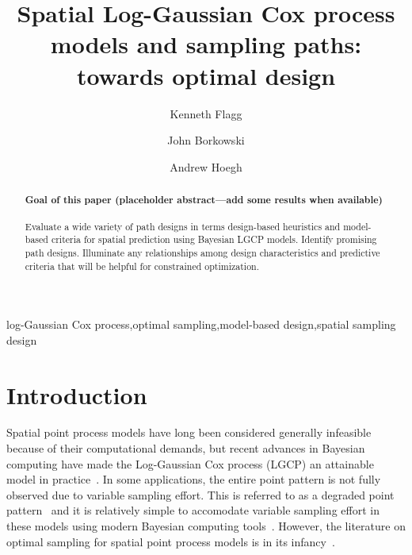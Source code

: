 \documentclass[review]{elsarticle}
\begin{document}
\begin{frontmatter}

\title{Spatial Log-Gaussian Cox process models and sampling paths: towards optimal design}

\author[msuaddr]{Kenneth Flagg}

\author[msuaddr]{John Borkowski}
\author[msuaddr]{Andrew Hoegh}

\address[msuaddr]{Department of Mathematical Sciences, Montana State University, Bozeman, MT 59717}

\begin{abstract}

\paragraph{Goal of this paper (placeholder abstract---add some results when
available)} Evaluate a wide variety of path designs in terms design-based
heuristics and model-based criteria for spatial prediction using Bayesian LGCP
models. Identify promising path designs. Illuminate any relationships among
design characteristics and predictive criteria that will be helpful for
constrained optimization.

\end{abstract}

\begin{keyword}
log-Gaussian Cox process\sep optimal sampling\sep model-based design\sep spatial sampling design
\end{keyword}

\end{frontmatter}

\linenumbers



\section{Introduction}

Spatial point process models have long been considered generally infeasible
because of their computational demands, but recent advances in Bayesian
computing have made the Log-Gaussian Cox process (LGCP) an attainable model in
practice~\citep{rueetal, lindgrenetal, illianetal, simpsonetal}. In some
applications, the entire point pattern is not fully observed due to variable
sampling effort. This is referred to as a degraded point
pattern~\citep{chakrabortyetal} and it is relatively simple to accomodate
variable sampling effort in these models using modern Bayesian computing
tools~\citep{yuanetal}. However, the literature on optimal sampling for spatial
point process models is in its infancy~\citep{liuvanhatalo}.
\end{document}
